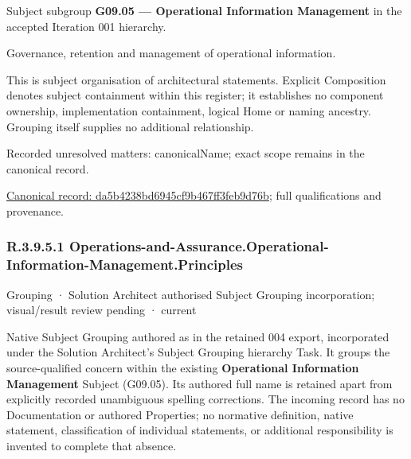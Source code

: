 Subject subgroup \textbf{G09.05 — Operational Information Management} in the accepted Iteration 001 hierarchy.



Governance, retention and management of operational information.



This is subject organisation of architectural statements. Explicit Composition denotes subject containment within this register; it establishes no component ownership, implementation containment, logical Home or naming ancestry. Grouping itself supplies no additional relationship.


{\small Recorded unresolved matters: canonicalName; exact scope remains in the canonical record.}\par
{\footnotesize \href{../../../../continuum/grouping/da5b4238bd6945cf9b467ff3feb9d76b.md}{Canonical record: da5b4238bd6945cf9b467ff3feb9d76b}; full qualifications and provenance.}\par
\subsubsection*{R.3.9.5.1 Operations-and-Assurance.Operational-Information-Management.Principles}
\label{navigation:R.3.9.5.1}

\label{element:63807867e2d147528542a914952b3e3e}
{\small Grouping · Solution Architect authorised Subject Grouping incorporation; visual/result review pending · current}\par

Native Subject Grouping authored as \texttt{} in the retained 004 export,
incorporated under the Solution Architect's Subject Grouping hierarchy Task.
It groups the source-qualified \texttt{} concern within
the existing \textbf{Operational Information Management} Subject (G09.05). Its authored full name
is retained apart from explicitly recorded unambiguous spelling corrections.
The incoming record has no Documentation or authored Properties; no normative
definition, native statement, classification of individual statements, or
additional responsibility is invented to complete that absence.



